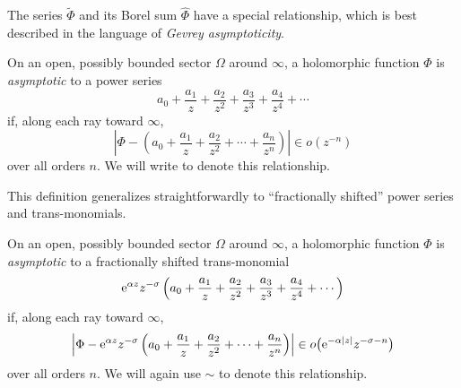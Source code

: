 \documentclass[pdftex]{sigma}
\newcommand{\series}[1]{\tilde{#1}}
\numberwithin{equation}{section}
\begin{document}
The series $\series{\Phi}$ and its Borel sum $\hat{\Phi}$ have a special relationship, which is best described in the language of {\em Gevrey asymptoticity}.
\begin{Definition}
On an open, possibly bounded sector $\Omega$ around $\infty$, a holomorphic function $\Phi$ is {\em asymptotic} to a power series
\begin{equation}\label{series:asymp-definition}
a_0 + \frac{a_1}{z} + \frac{a_2}{z^2} + \frac{a_3}{z^3} + \frac{a_4}{z^4} + \cdots
\end{equation}
if, along each ray toward $\infty$,
\[ \left|\Phi - \left(a_0 + \frac{a_1}{z} + \frac{a_2}{z^2} + \cdots + \frac{a_n}{z^n} \right) \right| \in o(z^{-n}) \]
over all orders $n$. We will write
to denote this relationship.
\end{Definition}
This definition generalizes straightforwardly to ``fractionally shifted'' power series and trans-monomials.
\begin{Definition}
On an open, possibly bounded sector $\Omega$ around $\infty$, a holomorphic function $\Phi$ is {\em asymptotic} to a fractionally shifted trans-monomial
\[%
{\rm e}^{\alpha z} z^{-\sigma} \left(a_0 + \frac{a_1}{z} + \frac{a_2}{z^2} + \frac{a_3}{z^3} + \frac{a_4}{z^4} + \cdots\right)
\]
if, along each ray toward $\infty$,
\[ \left|\Phi - {\rm e}^{\alpha z} z^{-\sigma} \left(a_0 + \frac{a_1}{z} + \frac{a_2}{z^2} + \cdots + \frac{a_n}{z^n} \right) \right| \in o\bigl({\rm e}^{-\alpha|z|} z^{-\sigma-n}\bigr) \]
over all orders $n$. We will again use $\sim$ to denote this relationship.
\end{Definition}
\end{document}
